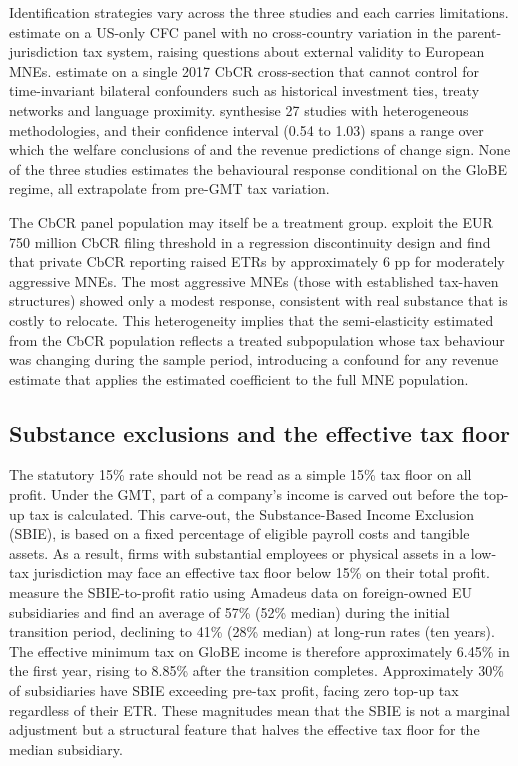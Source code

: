 \documentclass[11pt,a4paper]{article}
\begin{document}
Identification strategies vary across the three studies and each carries limitations. \citet{dowd2017} estimate on a US-only CFC panel with no cross-country variation in the parent-jurisdiction tax system, raising questions about external validity to European MNEs. \citet{garcia-bernardo2024} estimate on a single 2017 CbCR cross-section that cannot control for time-invariant bilateral confounders such as historical investment ties, treaty networks and language proximity. \citet{heckemeyer2017} synthesise 27 studies with heterogeneous methodologies, and their confidence interval (0.54 to 1.03) spans a range over which the welfare conclusions of \citet{johannesen2022} and the revenue predictions of \citet{vantriet2025} change sign. None of the three studies estimates the behavioural response conditional on the GloBE regime, all extrapolate from pre-GMT tax variation.

The CbCR panel population may itself be a treatment group. \citet{tuinsma2025} exploit the EUR 750 million CbCR filing threshold in a regression discontinuity design and find that private CbCR reporting raised ETRs by approximately 6 pp for moderately aggressive MNEs. The most aggressive MNEs (those with established tax-haven structures) showed only a modest response, consistent with real substance that is costly to relocate. This heterogeneity implies that the semi-elasticity estimated from the CbCR population reflects a treated subpopulation whose tax behaviour was changing during the sample period, introducing a confound for any revenue estimate that applies the estimated coefficient to the full MNE population.

\subsection{Substance exclusions and the effective tax floor}\label{sec:substance_lit}

The statutory 15\% rate should not be read as a simple 15\% tax floor on all profit. Under the GMT, part of a company’s income is carved out before the top-up tax is calculated. This carve-out, the Substance-Based Income Exclusion (SBIE), is based on a fixed percentage of eligible payroll costs and tangible assets. As a result, firms with substantial employees or physical assets in a low-tax jurisdiction may face an effective tax floor below 15\% on their total profit. \citet{devereux2023} measure the SBIE-to-profit ratio using Amadeus data on foreign-owned EU subsidiaries and find an average of 57\% (52\% median) during the initial transition period, declining to 41\% (28\% median) at long-run rates (ten years). The effective minimum tax on GloBE income is therefore approximately 6.45\% in the first year, rising to 8.85\% after the transition completes. Approximately 30\% of subsidiaries have SBIE exceeding pre-tax profit, facing zero top-up tax regardless of their ETR. These magnitudes mean that the SBIE is not a marginal adjustment but a structural feature that halves the effective tax floor for the median subsidiary.
\end{document}
